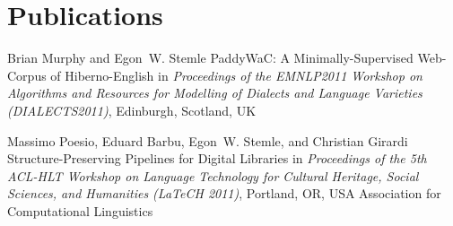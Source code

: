 \documentclass[11pt,a4paper]{moderncv}
\begin{document}

%
%


%
%

\section{Publications}
    {Brian Murphy and Egon~W. Stemle}
    {\small PaddyWaC: A Minimally-Supervised Web-Corpus of Hiberno-English}
    {\small in {\em Proceedings of the EMNLP2011 Workshop on Algorithms and Resources for Modelling of Dialects and Language Varieties (DIALECTS2011)}, Edinburgh, Scotland, UK}
    {}
    {}

    {Massimo Poesio, Eduard Barbu, Egon~W. Stemle, and Christian Girardi}
    {Structure-Preserving Pipelines for Digital Libraries}
    {\small in {\em Proceedings of the 5th ACL-HLT Workshop on Language Technology for Cultural Heritage, Social Sciences, and Humanities (LaTeCH 2011)}, Portland, OR, USA}
    {\small Association for Computational Linguistics}
    {}
\end{document}
